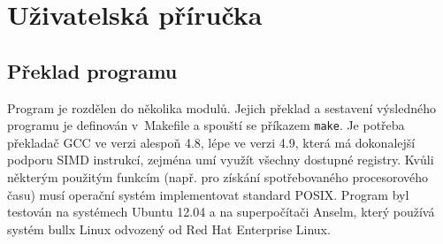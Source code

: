 

\newcommand\cmdarglist[1]{
    \begin{description}#1\end{description}
}

\newcommand\cmdarg[2]{
    \item[\texttt{#1}] \hfill \\
    #2
}

\newcommand\cmdargdef[3]{
    \item[\texttt{#1}] (výchozí: #2) \hfill \\
    #3
}

\chapter{Uživatelská příručka}
\label{apxManual}

\section{Překlad programu}

Program je rozdělen do několika modulů. Jejich překlad a sestavení výsledného programu je definován v~Makefile a spouští se příkazem \texttt{make}. Je potřeba překladač GCC ve verzi alespoň 4.8, lépe ve verzi 4.9, která má dokonalejší podporu SIMD instrukcí, zejména umí využít všechny dostupné registry. Kvůli některým použitým funkcím (např. pro získání spotřebovaného procesorového času) musí operační systém implementovat standard POSIX. Program byl testován na systémech Ubuntu 12.04 a na superpočítači Anselm, který používá systém bullx Linux odvozený od Red Hat Enterprise Linux.


